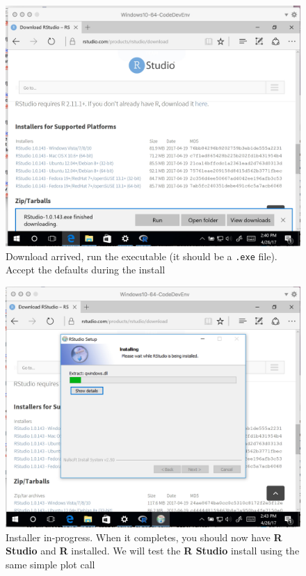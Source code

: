 \begin{figure}[h!] %
   \centering
   \includegraphics[width=4.5in]{./1-Introduction/repositoryR2.jpg} 
   \caption{Download arrived, run the executable (it should be a \texttt{.exe} file).  Accept the defaults during the install}
\end{figure}

\begin{figure}[h!] %
   \centering
   \includegraphics[width=4.5in]{./1-Introduction/runInstall2.jpg} 
   \caption{Installer in-progress.  When it completes, you should now have \textbf{R Studio} and \textbf{R} installed.  We will test the \textbf{R Studio} install using the same simple plot call}
\end{figure}


